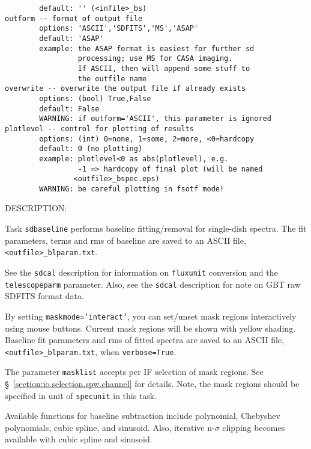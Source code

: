 \begin{verbatim}
        default: '' (<infile>_bs)
outform -- format of output file
        options: 'ASCII','SDFITS','MS','ASAP'
        default: 'ASAP'
        example: the ASAP format is easiest for further sd
                 processing; use MS for CASA imaging.
                 If ASCII, then will append some stuff to
                 the outfile name
overwrite -- overwrite the output file if already exists
        options: (bool) True,False
        default: False
        WARNING: if outform='ASCII', this parameter is ignored
plotlevel -- control for plotting of results
        options: (int) 0=none, 1=some, 2=more, <0=hardcopy
        default: 0 (no plotting)
        example: plotlevel<0 as abs(plotlevel), e.g.
                 -1 => hardcopy of final plot (will be named
                <outfile>_bspec.eps)
        WARNING: be careful plotting in fsotf mode!

\end{verbatim}

DESCRIPTION:

Task {\tt sdbaseline} performs baseline fitting/removal for single-dish spectra.
The fit parameters, terms and rms of baseline are saved to an ASCII
file, {\tt <outfile>\_blparam.txt}.

See the {\tt sdcal} description for information on {\tt fluxunit} 
conversion and the {\tt telescopeparm} parameter.
Also, see the {\tt sdcal} description for note on GBT raw SDFITS format data.

By setting {\tt maskmode='interact'}, you can set/unset mask regions interactively using
mouse buttons. Current mask regions will be shown with yellow shading.
Baseline fit parameters and rms of fitted spectra are saved to an
ASCII file, {\tt <outfile>\_blparam.txt}, when {\tt verbose=True}.

The parameter {\tt masklist} accepts per IF selection of mask regions. 
See \S~\ref{section:io.selection.spw.channel} for details. 
Note, the mask regions should be specified in unit of {\tt specunit} 
in this task.

Available functions for baseline subtraction include polynomial, Chebyshev polynomials, 
cubic spline, and sinusoid. 
Also, iterative n-$\sigma$ clipping becomes available with cubic spline and sinusoid. 

